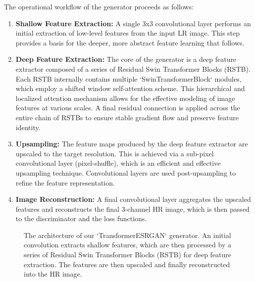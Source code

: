 \documentclass{article}
\begin{document}
The operational workflow of the generator proceeds as follows:
\begin{enumerate}
    \item \textbf{Shallow Feature Extraction:} A single 3x3 convolutional layer performs an initial extraction of low-level features from the input LR image. This step provides a basis for the deeper, more abstract feature learning that follows.
    \item \textbf{Deep Feature Extraction:} The core of the generator is a deep feature extractor composed of a series of Residual Swin Transformer Blocks (RSTB). Each RSTB internally contains multiple `SwinTransformerBlock` modules, which employ a shifted window self-attention scheme. This hierarchical and localized attention mechanism allows for the effective modeling of image features at various scales. A final residual connection is applied across the entire chain of RSTBs to ensure stable gradient flow and preserve feature identity.
    \item \textbf{Upsampling:} The feature maps produced by the deep feature extractor are upscaled to the target resolution. This is achieved via a sub-pixel convolutional layer (pixel-shuffle), which is an efficient and effective upsampling technique. Convolutional layers are used post-upsampling to refine the feature representation.
    \item \textbf{Image Reconstruction:} A final convolutional layer aggregates the upscaled features and reconstructs the final 3-channel HR image, which is then passed to the discriminator and the loss functions.
\end{enumerate}

\begin{figure}[h!]
\centering
\caption{The architecture of our `TransformerESRGAN` generator. An initial convolution extracts shallow features, which are then processed by a series of Residual Swin Transformer Blocks (RSTB) for deep feature extraction. The features are then upscaled and finally reconstructed into the HR image.}
\label{fig:generator_arch}
\end{figure}
\end{document}
